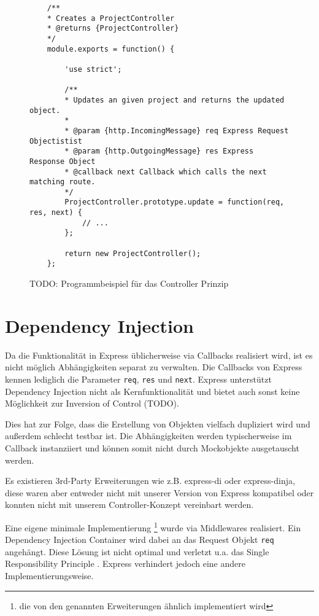 \begin{figure}[t]
	\centering
	\begin{lstlisting}
	/**
	* Creates a ProjectController
	* @returns {ProjectController}
	*/
	module.exports = function() {
	
		'use strict';
		
		/**
		* Updates an given project and returns the updated object.
		*
		* @param {http.IncomingMessage} req Express Request Objectistist
		* @param {http.OutgoingMessage} res Express Response Object
		* @callback next Callback which calls the next matching route.
		*/
		ProjectController.prototype.update = function(req, res, next) {
			// ...
		};
		
		return new ProjectController();
	};
	\end{lstlisting}
	\caption[controller]{TODO: Programmbeispiel für das Controller Prinzip}
	\label{f:controller}
\end{figure}

\section{Dependency Injection}\label{dependency-injection}

Da die Funktionalität in Express üblicherweise\cite{express-routing}
via Callbacks realisiert wird, ist es nicht möglich Abhängigkeiten
separat zu verwalten. Die Callbacks von Express kennen lediglich die
Parameter \texttt{req}, \texttt{res} und \texttt{next}. Express
unterstützt Dependency Injection nicht als Kernfunktionalität und bietet
auch sonst keine Möglichkeit zur Inversion of Control (TODO).

Dies hat zur Folge, dass die Erstellung von Objekten vielfach dupliziert
wird und außerdem schlecht testbar ist. Die Abhängigkeiten werden
typischerweise im Callback instanziiert und können somit nicht durch
Mockobjekte ausgetauscht werden.

Es existieren 3rd-Party Erweiterungen wie z.B. express-di\cite{express-di} oder
express-dinja\cite{express-dinja}, diese
waren aber entweder nicht mit unserer Version von Express kompatibel
oder konnten nicht mit unserem Controller-Konzept vereinbart werden.

Eine eigene minimale Implementierung \footnote{die von den genannten
Erweiterungen ähnlich implementiert wird} wurde via Middlewares
realisiert. Ein Dependency Injection Container wird dabei an das Request
Objekt \texttt{req} angehängt. Diese Lösung ist nicht optimal und
verletzt u.a. das Single Responsibility Principle
\cite{srp}. Express verhindert jedoch eine
andere Implementierungsweise.

